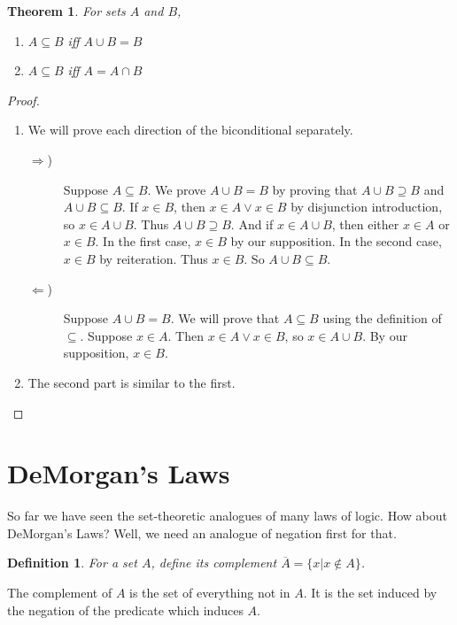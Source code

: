\documentclass[12pt]{article}
\newcounter{dfnc}
\newcounter{thmc}
\newtheorem{dfn}[dfnc]{Definition}
\newtheorem{thm}[thmc]{Theorem}
\begin{document}
\begin{thm}\label{thm:relfromop}
  For sets $A$ and $B$,
  \begin{enumerate}[label=\alph*)]
  \item $A\subseteq B$ iff $A\cup B=B$
  \item $A\subseteq B$ iff $A=A\cap B$
  \end{enumerate}
\end{thm}
\begin{proof}
  \begin{enumerate}[label=\alph*)]
    \item We will prove each direction of the biconditional
      separately.
      \begin{description}
        \item[$\Rightarrow$)] Suppose $A\subseteq B$.  We prove $A\cup
          B=B$ by proving that $A\cup B \supseteq B$ and $A\cup
          B\subseteq B$.  If $x\in B$, then $x\in A\vee x\in B$ by
          disjunction introduction, so $x\in A\cup B$.  Thus $A\cup
          B\supseteq B$.  And if $x\in A\cup B$, then either $x\in A$
          or $x\in B$.  In the first case, $x\in B$ by our
          supposition.  In the second case, $x\in B$ by reiteration.
          Thus $x\in B$.  So $A\cup B\subseteq B$.
        \item[$\Leftarrow$)] Suppose $A\cup B=B$.  We will prove that
          $A\subseteq B$ using the definition of $\subseteq$.  Suppose
          $x\in A$.  Then $x\in A\vee x\in B$, so $x\in A\cup B$.  By
          our supposition, $x\in B$.
      \end{description}
    \item The second part is similar to the first.
  \end{enumerate}
\end{proof}

\section{DeMorgan's Laws}

So far we have seen the set-theoretic analogues of many laws of logic.
How about DeMorgan's Laws?  Well, we need an analogue of negation
first for that.

\begin{dfn}
  For a set $A$, define its complement $\overline{A}=\{x|x\not\in A\}$.
\end{dfn}

The complement of $A$ is the set of everything not in $A$.  It is the
set induced by the negation of the predicate which induces $A$.
\end{document}
